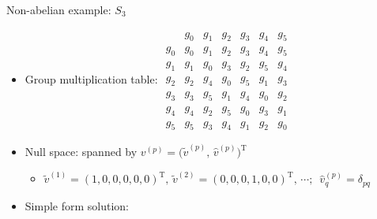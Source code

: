 \documentclass{fdubeamer}
\newcommand{\1}{\mathbb{1}}
\newcommand{\trans}{{\mathrm{T}}}
\begin{document}
\begin{frame}{Non-abelian example: \texorpdfstring{$S_3$}{𝑆₃}}

\linespread{1.4}
\selectfont

\begin{itemize}
  \item Group multiplication table:
    \begingroup
      \tiny
      \setlength{\arraycolsep}{4pt}
      $
        \begin{array}{c|cccccc}
          & g_0 & g_1 & g_2 & g_3 & g_4 & g_5 \\
          \hline
          g_0 & g_0 & g_1 & g_2 & g_3 & g_4 & g_5 \\
          g_1 & g_1 & g_0 & g_3 & g_2 & g_5 & g_4 \\
          g_2 & g_2 & g_4 & g_0 & g_5 & g_1 & g_3 \\
          g_3 & g_3 & g_5 & g_1 & g_4 & g_0 & g_2 \\
          g_4 & g_4 & g_2 & g_5 & g_0 & g_3 & g_1 \\
          g_5 & g_5 & g_3 & g_4 & g_1 & g_2 & g_0
        \end{array}
      $
    \endgroup
  \item Null space: spanned by $v^{(p)}=\bigl( \tilde{v}^{(p)}, \, \hat{v}^{(p)} \bigr)^\trans$

    \begin{itemize}
      \item $\tilde{v}^{(1)}=(1,0,0,0,0,0)^\trans, \, \tilde{v}^{(2)}=(0,0,0,1,0,0)^\trans, \, \cdots; \enspace \hat{v}^{(p)}_q=\delta_{pq}$
    \end{itemize}

  \item Simple form solution:


\end{itemize}
\end{frame}
\end{document}
